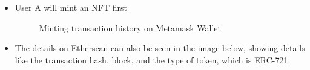 \begin{itemize}
    \item User A will mint an NFT first

    \begin{figure} [H] \centering
    \caption{Minting transaction history on Metamask Wallet}
    \label{fig:minting}
    \end{figure}

    \item The details on Etherscan can also be seen in the image below, showing details like the transaction hash, block, and the type of token, which is ERC-721.


\end{itemize}
